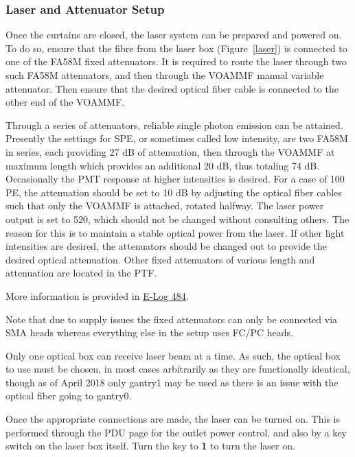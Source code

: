 \documentclass[twoside,letterpaper]{refart}
\begin{document}

\subsubsection{Laser and Attenuator Setup}

Once the curtains are closed, the laser system can be prepared and powered on. To do so, ensure that the fibre from the laser box (Figure~\ref{laser}) is connected to one of the FA58M fixed attenuators. It is required to route the laser through two such FA58M attenuators, and then through the VOAMMF manual variable attenuator. Then ensure that the desired optical fiber cable is connected to the other end of the VOAMMF.

Through a series of attenuators, reliable single photon emission can be attained. Presently the settings for SPE, or sometimes called low intensity, are two FA58M in series, each providing 27 dB of attenuation, then through the VOAMMF at maximum length which provides an additional 20 dB, thus totaling 74 dB. Occasionally the PMT response at higher intensities is desired. For a case of 100 PE, the attenuation should be set to 10 dB by adjusting the optical fiber cables such that only the VOAMMF is attached, rotated halfway. The laser power output is set to 520, which should not be changed without consulting others. The reason for this is to maintain a stable optical power from the laser. If other light intensities are desired, the attenuators should be changed out to provide the desired optical attenuation. Other fixed attenuators of various length and attenuation are located in the PTF.

More information is provided in \href{https://midptf01.triumf.ca/elog/PTF/484}{E-Log 484}.

Note that due to supply issues the fixed attenuators can only be connected via SMA heads whereas everything else in the setup uses FC/PC heads.

Only one optical box can receive laser beam at a time. As such, the optical box to use must be chosen, in most cases arbitrarily as they are functionally identical, though as of April 2018 only gantry1 may be used as there is an issue with the optical fiber going to gantry0.

Once the appropriate connections are made, the laser can be turned on. This is performed through the PDU page for the outlet power control, and also by a key switch on the laser box itself. Turn the key to \textbf{1} to turn the laser on.
\end{document}
